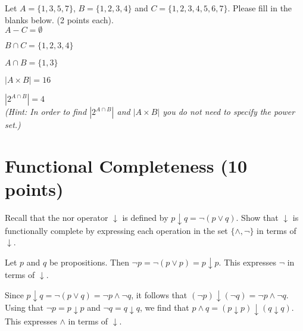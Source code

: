 \documentclass[11pt]{article}
\def\sectionOneA#1{}
\def\sectionOneB#1{}
\def\sectionTwoA#1{}
\def\sectionTwoB#1{}
\def\sectionVicsection#1{#1}
\newcounter{pgpts}
\begin{document}
Let \sectionOneA{$A=\{4,6,8\}$}\sectionOneB{$A=\{1,5,9\}$}\sectionTwoA{$A=\{3,6,9\}$}\sectionTwoB{$A=\{4,7,10\}$}
\sectionVicsection{$A=\{1,3,5,7\}$, $B=\{1,2,3,4\}$}
and $C=\{1,2,3,4,5,6,7\}$. Please fill in the blanks below. (2 points each).\\[5ex]

$A - C = \emptyset$
\vspace*{1cm}

$B\cap C= \{1,2,3,4\}$
\vspace*{1cm}

 $A\cap B = \{1,3\}$ 
\vspace*{1cm}

\sectionOneA{$A \times \{1\} = $}
\sectionOneB{$A \times \{1\} = $} %
\sectionTwoA{$\{1\} \times A = $}
\sectionTwoB{$\{1\} \times A = $} %
\sectionVicsection{$|A \times B|=16$}

\vspace*{1cm}
 
 $|2^{A\cap B}| = 4$\\ 
\vspace*{0.5cm}
{\em (Hint: In order to find $|2^{A\cap B}|$ and $|A\times B|$ you do not need to specify the power set.)}
\vspace{1cm}
\section{Functional Completeness (10 points)}\addtocounter{pgpts}{10}
Recall that the nor operator $\downarrow$ is defined by $p\downarrow q = \neg (p \vee q)$. Show that $\downarrow$ is functionally complete by expressing each operation in the set $\{\wedge, \neg\}$ in terms of $\downarrow$.

\vspace{1cm}

Let $p$ and $q$ be propositions. Then $\neg p = \neg (p \vee p) = p\downarrow p$. This expresses $\neg$ in terms of $\downarrow$.
\vspace{1cm}

Since $p\downarrow q = \neg(p\vee q) = \neg p \wedge \neg q$, it follows that $(\neg p) \downarrow (\neg q) = \neg p \wedge \neg q$. Using that $\neg p= p\downarrow p $ and $\neg q = q \downarrow q $, we find that $p\wedge q= (p\downarrow p) \downarrow (q\downarrow q)$. This expresses $\wedge$ in terms of $\downarrow$.
\end{document}
